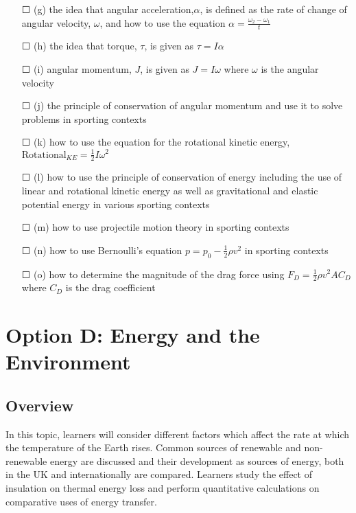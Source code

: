 \begin{itemize}
\begin{itemize}
	\end{itemize}\item[\Large{$\Square$}] (g) the idea that angular acceleration,\(\alpha \), is defined as the rate of change of angular velocity, \(\omega\), and how to use the equation \( \alpha = \frac{\omega_{2} - \omega_{1}}{t} \)
	\item[\Large{$\Square$}] (h) the idea that torque, \(\tau\), is given as \(\tau=I\alpha \)
	\item[\Large{$\Square$}] (i) angular momentum, \(J\), is given as \( J=I\omega \) where \(\omega\) is the angular velocity
	\item[\Large{$\Square$}] (j) the principle of conservation of angular momentum and use it to solve
	problems in sporting contexts
	\item[\Large{$\Square$}] (k) how to use the equation for the rotational kinetic energy, \(\text{Rotational}_{KE}=\frac{1}{2}I\omega^{2}\)
	\item[\Large{$\Square$}] (l) how to use the principle of conservation of energy including the use of linear and rotational kinetic energy as well as gravitational and elastic potential
	energy in various sporting contexts
	\item[\Large{$\Square$}] (m) how to use projectile motion theory in sporting contexts
	\item[\Large{$\Square$}] (n) how to use Bernoulli’s equation \(p=p_{0} - \frac{1}{2}\rho v^{2}\) in sporting contexts
	\item[\Large{$\Square$}] (o) how to determine the magnitude of the drag force using \( F_{D}=\frac{1}{2}\rho v^{2}AC_{D} \) where \(C_{D}\) is the drag coefficient
\end{itemize}
\newpage
\section*{Option D: Energy and the Environment}
\subsection*{Overview}
In this topic, learners will consider different factors which affect the rate at which the
temperature of the Earth rises. Common sources of renewable and non-renewable
energy are discussed and their development as sources of energy, both in the UK
and internationally are compared. Learners study the effect of insulation on thermal
energy loss and perform quantitative calculations on comparative uses of energy
transfer.
